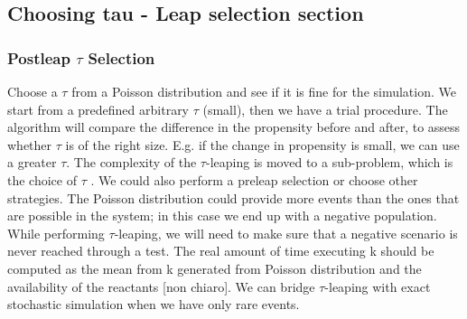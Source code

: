 \subsection{Choosing tau - Leap selection section}

\subsubsection{\texorpdfstring{\textbf{Postleap $\tau$ Selection}}{Postleap Selection}}
Choose a $\tau$ from a Poisson distribution and see if it is fine for the simulation.
We start from a predefined arbitrary $\tau$ (small), then we have a trial procedure.
The algorithm will compare the difference in the propensity before and after, to assess whether $\tau$ is of the right size.
E.g. if the change in propensity is small, we can use a greater $\tau$.
The complexity of the $\tau$-leaping is moved to a sub-problem, which is the choice of $\tau$ .
We could also perform a preleap selection or choose other strategies.
The Poisson distribution could provide more events than the ones that are possible in the system; in this case we end up with a negative population.
While performing $\tau$-leaping, we will need to make sure that a negative scenario is never reached through a test.
The real amount of time executing k should be computed as the mean from k generated from Poisson distribution and the availability of the reactants {[}non chiaro{]}.
We can bridge $\tau$-leaping with exact stochastic simulation when we have only rare events.

